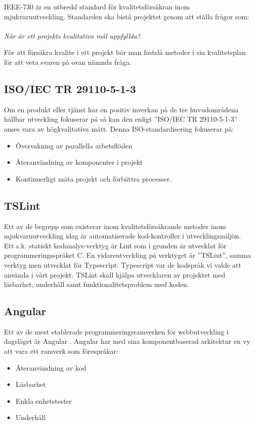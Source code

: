 IEEE-730 är en utbredd standard för kvalitetsförsäkran inom mjukvaruutveckling. Standarden ska bistå projektet genom att ställa frågor som:
\\ \\
\emph{När är ett projekts kvalitativa mål uppfyllda?}

För att försäkra kvalite i ett projekt bör man fastslå metoder i sin kvalitetsplan för att veta svaren på ovan nämnda fråga. \\


\subsection{ISO/IEC TR 29110-5-1-3}
Om en produkt eller tjänst har en positiv inverkan på de tre huvudområdena hållbar utveckling fokuserar på så kan den enligt ”ISO/IEC TR 29110-5-1-3” \cite{ISOtor} anses vara av högkvalitativa mått. Denna ISO-standardisering fokuserar på: 

\begin{itemize}
	\item Övervakning av parallella arbetsflöden
	\item Återanvändning av komponenter i projekt
	\item Kontinuerligt mäta projekt och förbättra processer.
\end{itemize}


\subsection{TSLint}
Ett av de begrepp som existerar inom kvalitetsförsäkrande metoder inom mjukvaruutveckling idag är automatiserade kod-kontroller i utvecklingsmiljön.
Ett s.k. statiskt kodanalys-verktyg är Lint som i grunden är utvecklat för programmeringsspråket C. En vidareutveckling på verktyget är ”TSLint”, samma verktyg men utvecklat för Typescript. Typescript var de kodspråk vi valde att använda i vårt projekt. TSLint skall hjälpa utvecklaren av projektet med läsbarhet, underhåll samt funktionalitetsproblem med koden.

\subsection{Angular}
Ett av de mest etablerade programmeringsramverken för webbutveckling i dagsläget är Angular \cite{altexsoft}. Angular har med sina komponentbaserad arkitektur en vy att vara ett ramverk som förespråkar:

\begin{itemize}
	\item Återanvändning av kod
	\item Läsbarhet
	\item Enkla enhetstester
	\item Underhåll
\end{itemize}

